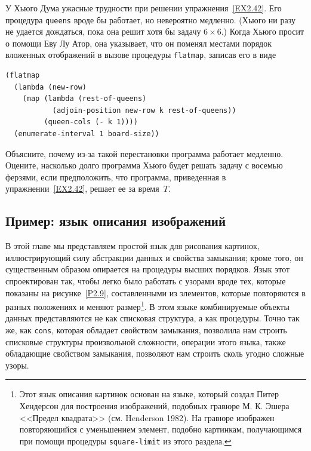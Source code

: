 \begin{exercise}{2.43}\label{EX2.43}%
У Хьюго Дума ужасные трудности при решении 
упражнения~\ref{EX2.42}.  Его процедура {\tt queens} вроде бы
работает, но невероятно медленно. (Хьюго ни разу не удается дождаться,
пока она решит хотя бы задачу $6 \times 6$.)  Когда Хьюго
просит о помощи Еву Лу Атор, она указывает, что он поменял местами
порядок вложенных отображений в вызове процедуры {\tt flatmap},
записав его в виде

\begin{Verbatim}[fontsize=\small]
(flatmap
  (lambda (new-row)
    (map (lambda (rest-of-queens)
           (adjoin-position new-row k rest-of-queens))
         (queen-cols (- k 1))))
  (enumerate-interval 1 board-size))
\end{Verbatim}
Объясните, почему из-за такой перестановки программа работает медленно.
Оцените, насколько долго программа Хьюго будет решать задачу с восемью
ферзями, если предположить, что программа, приведенная в 
упражнении~\ref{EX2.42}, решает ее за время~$T$.
\end{exercise}

\subsection{Пример: язык описания изображений}
\label{EXAMPLE-A-PICTURE-LANGUAGE}


В этой главе мы представляем простой язык для рисования
картинок, иллюстрирующий силу абстракции данных и свойства замыкания;
кроме того, он существенным образом опирается на процедуры высших
порядков.  Язык этот спроектирован так, чтобы легко было работать с
узорами вроде тех, которые показаны на рисунке~\ref{P2.9},
составленными из элементов, которые повторяются в разных положениях и
меняют размер\footnote{Этот язык описания картинок основан на языке,
который создал Питер Хендерсон для построения изображений, подобных
гравюре  М. К. Эшера <<Предел квадрата>> (см. Henderson
1982). 
На гравюре изображен 
повторяющийся с уменьшением элемент, подобно картинкам, получающимся
при помощи процедуры {\tt square-limit} из этого раздела.}.
В этом языке комбинируемые объекты данных представляются не как
списковая структура, а как процедуры.  Точно так же, как
{\tt cons}, которая обладает свойством замыкания, позволила
нам строить списковые структуры произвольной сложности, операции этого 
языка, также обладающие свойством замыкания, позволяют нам строить
сколь угодно сложные узоры.


